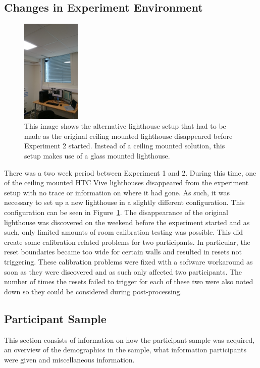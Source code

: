 \subsection{Changes in Experiment Environment}\label{sec:ex2environmentchanges}
\begin{figure}[tbph]
    \centering
    \includegraphics[width=0.25\textwidth]{figures/images/experiment2EnvironmentChanges.jpg}
    \caption[Changes in Experiment Environment for Experiment 2]{This image shows the alternative lighthouse setup that had to be made as the original ceiling mounted lighthouse disappeared before Experiment 2 started. Instead of a ceiling mounted solution, this setup makes use of a glass mounted lighthouse.}
    \label{fig:ex2changedLighthouse}
\end{figure}

There was a two week period between Experiment 1 and 2. During this time, one of the ceiling mounted HTC Vive lighthouses disappeared from the experiment setup with no trace or information on where it had gone. As such, it was necessary to set up a new lighthouse in a slightly different configuration. This configuration can be seen in Figure~\ref{fig:ex2changedLighthouse}. The disappearance of the original lighthouse was discovered on the weekend before the experiment started and as such, only limited amounts of room calibration testing was possible. This did create some calibration related problems for two participants. In particular, the reset boundaries became too wide for certain walls and resulted in resets not triggering. These calibration problems were fixed with a software workaround as soon as they were discovered and as such only affected two participants. The number of times the resets failed to trigger for each of these two were also noted down so they could be considered during post-processing. 

\subsection{Participant Sample}
This section consists of information on how the participant sample was acquired, an overview of the demographics in the sample, what information participants were given and miscellaneous information. 
   
